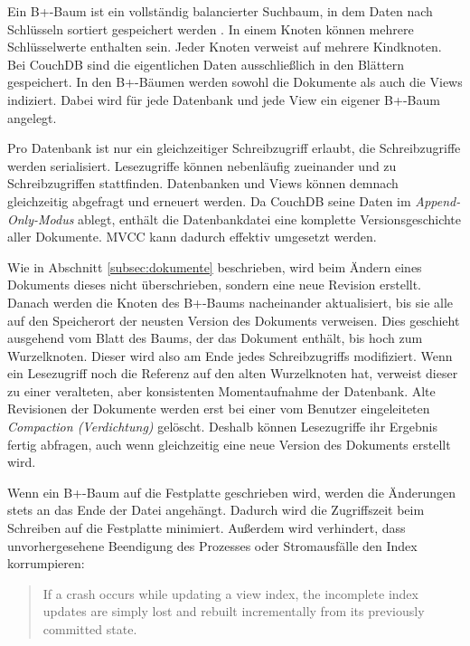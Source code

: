 Ein B+-Baum ist ein vollständig balancierter Suchbaum, in dem Daten nach Schlüsseln sortiert gespeichert werden . In einem Knoten können mehrere Schlüsselwerte enthalten sein. Jeder Knoten verweist auf mehrere Kindknoten. Bei CouchDB sind die eigentlichen Daten ausschließlich in den Blättern gespeichert. In den B+-Bäumen werden sowohl die Dokumente als auch die Views indiziert. Dabei wird für jede Datenbank und jede View ein eigener B+-Baum angelegt. 

Pro Datenbank ist nur ein gleichzeitiger Schreibzugriff erlaubt, die Schreibzugriffe werden serialisiert. Lesezugriffe können nebenläufig zueinander und zu Schreibzugriffen stattfinden. Datenbanken und Views können demnach gleichzeitig abgefragt und erneuert werden. Da CouchDB seine Daten im \textit{Append-Only-Modus} ablegt, enthält die Datenbankdatei eine komplette Versionsgeschichte aller Dokumente. MVCC kann dadurch effektiv umgesetzt werden. 

Wie in Abschnitt \ref{subsec:dokumente} beschrieben, wird beim Ändern eines Dokuments dieses nicht überschrieben, sondern eine neue Revision erstellt. Danach werden die Knoten des B+-Baums nacheinander aktualisiert, bis sie alle auf den Speicherort der neusten Version des Dokuments verweisen. Dies geschieht ausgehend vom Blatt des Baums, der das Dokument enthält, bis hoch zum Wurzelknoten. Dieser wird also am Ende jedes Schreibzugriffs modifiziert. Wenn ein Lesezugriff noch die Referenz auf den alten Wurzelknoten hat, verweist dieser zu einer veralteten, aber konsistenten Momentaufnahme der Datenbank. Alte Revisionen der Dokumente werden erst bei einer vom Benutzer eingeleiteten \textit{Compaction (Verdichtung)} gelöscht. Deshalb können Lesezugriffe ihr Ergebnis fertig abfragen, auch wenn gleichzeitig eine neue Version des Dokuments erstellt wird. 

Wenn ein B+-Baum auf die Festplatte geschrieben wird, werden die Änderungen stets an das Ende der Datei angehängt. Dadurch wird die Zugriffszeit beim Schreiben auf die Festplatte minimiert. Außerdem wird verhindert, dass unvorhergesehene Beendigung des Prozesses oder Stromausfälle den Index korrumpieren: 

\begin{quote}
If a crash occurs while updating a view index, the incomplete index updates are simply lost and rebuilt incrementally from its previously committed state. \cite{couch:overview}
\end{quote}



